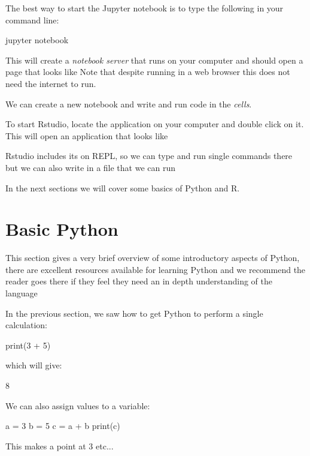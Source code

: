 The best way to start the Jupyter notebook is to type the following in your
command line:

\begin{cliin}
jupyter notebook
\end{cliin}

This will create a \textit{notebook server} that runs on your computer and
should open a page that looks like %
Note that despite running in a web browser this does not need the internet to
run.

We can create a new notebook and write and run code in the \textit{cells}.

To start Rstudio, locate the application on your computer and double click on
it. This will open an application that looks like %

Rstudio includes its on REPL, so we can type and run single commands there but
we can also write in a file that we can run

In the next sections we will cover some basics of Python and R.

\section{Basic Python}\label{sec:basic-python}

This section gives a very brief overview of some introductory aspects of Python,
there are excellent resources available for learning Python and we recommend the
reader goes there if they feel they need an in depth understanding of the
language %

In the previous section, we saw how to get Python to perform a single
calculation:

\begin{pyin}
print(3 + 5)
\end{pyin}

which will give:

\begin{pyout}
8
\end{pyout}

We can also assign values to a variable:

\begin{pyin}
a = 3
b = 5
c = a + b
print(c)
\end{pyin}

\begin{explanation}
This makes a point at 3 etc...  %
\end{explanation}


